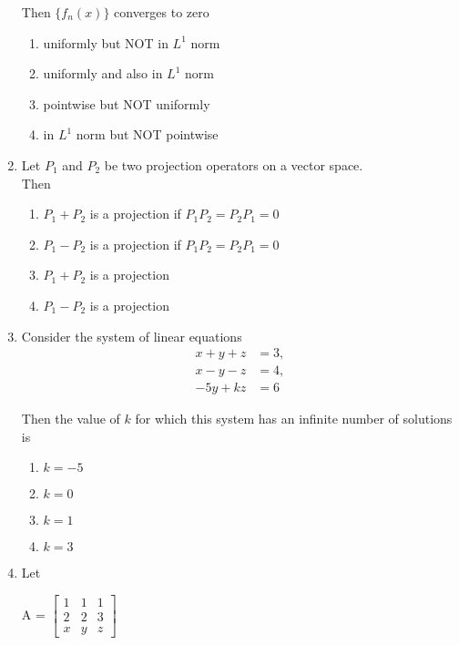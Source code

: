 \documentclass[journal]{IEEEtran}
\newcommand{\myvec}[1]{\begin{bmatrix}#1\end{bmatrix}}
\numberwithin{equation}{enumi}
\numberwithin{figure}{enumi}
\begin{document}
\begin{enumerate}
Then $\{f_n(x)\}$ converges to zero
\hfill{}

\begin{enumerate}
    \item uniformly but NOT in $L^1$ norm
    \item uniformly and also in $L^1$ norm
    \item pointwise but NOT uniformly
    \item in $L^1$ norm but NOT pointwise
\end{enumerate}

\item Let $P_1$ and $P_2$ be two projection operators on a vector space. \\ 
Then           \hfill{}
\begin{enumerate}
    \item $P_1 + P_2$ is a projection if $P_1 P_2 = P_2 P_1 = 0$
    \item $P_1 - P_2$ is a projection if $P_1 P_2 = P_2 P_1 = 0$
    \item $P_1 + P_2$ is a projection
    \item $P_1 - P_2$ is a projection
\end{enumerate}



\item Consider the system of linear equations         \hfill{}
\begin{align}
x + y + z &= 3 ,\\ 
x - y - z &= 4 , \\
-5y + kz &= 6
\end{align}

Then the value of $k$ for which this system has an infinite number of solutions is

\begin{enumerate}
    \item $k = -5$
    \item $k = 0$
    \item $k = 1$
    \item $k = 3$
\end{enumerate}



\item Let             \hfill{}

A = $\myvec{
1 & 1 & 1 \\
2 & 2 & 3 \\
x & y & z}$


\end{enumerate}
\end{document}

